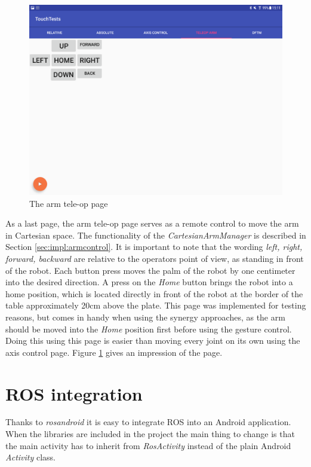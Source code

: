 \begin{figure}
	\caption{\label{fig:ui:teleop}The arm tele-op page}
	\includegraphics[width=0.9\linewidth]{assets/chpt_impl/teleop}
\end{figure}

As a last page, the arm tele-op page serves as a remote control to move the arm in Cartesian space. The functionality of the \textit{CartesianArmManager} is described in Section \ref{sec:impl:armcontrol}. It is important to note that the wording \textit{left, right, forward, backward} are relative to the operators point of view, as standing in front of the robot. Each button press moves the palm of the robot by one centimeter into the desired direction. A press on the \textit{Home} button brings the robot into a home position, which is located directly in front of the robot at the border of the table approximately 20cm above the plate. This page was implemented for testing reasons, but comes in handy when using the synergy approaches, as the arm should be moved into the \textit{Home} position first before using the gesture control. Doing this using this page is easier than moving every joint on its own using the axis control page. Figure \ref{fig:ui:teleop} gives an impression of the page.

\section{ROS integration}

Thanks to \textit{rosandroid} it is easy to integrate ROS into an Android application. When the libraries are included in the project the main thing to change is that the main activity has to inherit from \textit{RosActivity} instead of the plain Android \textit{Activity} class.

